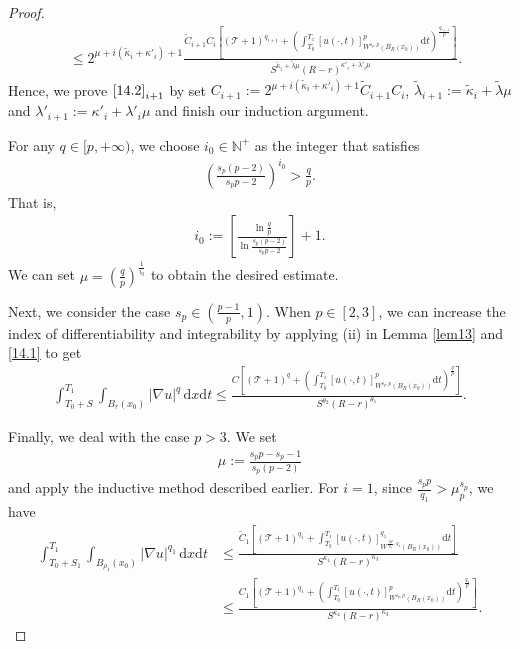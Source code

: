 \documentclass[reqno,10pt]{amsart}
\numberwithin{equation}{section}
\begin{document}
\begin{proof}
\begin{align*}
		&\le 2^{\mu+i(\tilde{\kappa}_i+\kappa'_i)+1}\frac{\widetilde{C}_{i+1}C_i\left[\left(\mathcal{T}+1\right)^{q_{i+1}}+\left( \int_{T_0}^{T_1}[u(\cdot,t)]^{p}_{W^{s_p,p}\left( B_{R}(x_0)\right)}\mathrm{d}t\right)^{\frac{q_{i+1}}{p}}\right]}{S  ^{\tilde{\kappa}_i+\tilde{\lambda}\mu}(R-r)^{\kappa'_i+\lambda'_i\mu}}.
	\end{align*}
	Hence, we prove $\text{\eqref{14.2}}_{i+1}$ by set $C_{i+1}:=2^{\mu+i(\tilde{\kappa}_i+\kappa'_i)+1}\widetilde{C}_{i+1}C_i$, $\tilde{\lambda}_{i+1}:=\tilde{\kappa}_i+\tilde{\lambda}\mu$ and $\lambda'_{i+1}:=\kappa'_i+\lambda'_i\mu$ and finish our induction argument.
	
	For any $q\in[p,+\infty)$, we choose $i_0\in \mathbb{N}^+$ as the integer that satisfies
	\begin{align*}
		\left( \frac{s_p(p-2)}{s_pp-2}\right)^{i_0}>\frac{q}{p}. 
	\end{align*}
	That is,
	\begin{align*}
		i_0:=\left[ \frac{\ln\frac{q}{p}}{\ln\frac{s_p(p-2)}{s_pp-2}}\right]+1.
	\end{align*}
	We can set $\mu=\left( \frac{q}{p}\right)^\frac{1}{i_0}$ to obtain the desired estimate.
	
	Next, we consider the case $s_p\in \left( \frac{p-1}{p},1\right)$. When $p\in[2,3]$, we can increase the index of differentiability and integrability by applying (ii) in Lemma \ref{lem13} and \eqref{14.1} to get
	\begin{align*}
		\int_{T_0+S}^{T_1}\int_{B_r(x_0)}|\nabla u|^q\,\mathrm{d}x\mathrm{d}t\le \frac{C\left[\left(\mathcal{T}+1\right)^q+\left( \int_{T_0}^{T_1}[u(\cdot,t)]^p_{W^{s_p,p}\left( B_R(x_0)\right)}\mathrm{d}t\right)^\frac{q}{p}\right]}{S^{\theta_2}(R-r)^{\theta_1}}.
	\end{align*}
	
	Finally, we deal with the case $p>3$. We set
	\begin{align*}
		\mu:=\frac{s_pp-s_p-1}{s_p(p-2)}
	\end{align*}
	and apply the inductive method described earlier. For $i=1$, since $\frac{s_pp}{q_1}>\mu^{s_p}_p$, we have
	\begin{align*}
		\int_{T_0+S_1}^{T_1}\int_{B_{\rho_1}(x_0)}|\nabla u|^{q_1}\,\mathrm{d}x\mathrm{d}t&\le \frac{\widetilde{C}_1\left[\left(\mathcal{T}+1\right)^{q_1}+ \int_{T_0}^{T_1}[u(\cdot,t)]^{q_1}_{W^{\frac{s_pp}{q_1},q_1}\left( B_R(x_0)\right)}\mathrm{d}t\right]}{S^{\kappa_4}(R-r)^{\kappa_3}}\\
		&\le \frac{C_1\left[\left(\mathcal{T}+1\right)^{q_1}+\left( \int_{T_0}^{T_1}[u(\cdot,t)]^{p}_{W^{s_p,p}\left( B_R(x_0)\right)}\mathrm{d}t\right)^\frac{q_1}{p}\right]}{S^{\kappa_4}(R-r)^{\kappa_3}}.
	\end{align*}
	

\end{proof}
\end{document}
